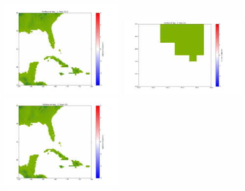 \documentclass[11pt]{article}
\begin{document}
\includegraphics[width=0.475\textwidth]{frame0047fig1002.png}
\vskip 10pt 
\includegraphics[width=0.475\textwidth]{frame0048fig1001.png}
\includegraphics[width=0.475\textwidth]{frame0048fig1002.png}
\end{document}
